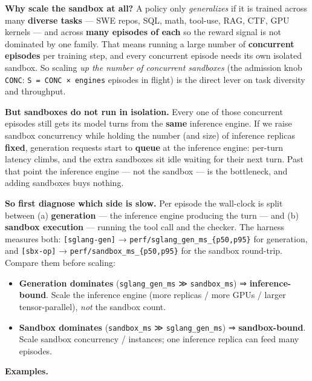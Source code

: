 \documentclass[
  paper=a4,
  ,captions=tableheading
]{scrartcl}
\providecommand{\tightlist}{%
  \setlength{\itemsep}{0pt}\setlength{\parskip}{0pt}}
\begin{document}
\textbf{Why scale the sandbox at all?} A policy only \emph{generalizes}
if it is trained across many \textbf{diverse tasks} --- SWE repos, SQL,
math, tool-use, RAG, CTF, GPU kernels --- and across \textbf{many
episodes of each} so the reward signal is not dominated by one family.
That means running a large number of \textbf{concurrent episodes} per
training step, and every concurrent episode needs its own isolated
sandbox. So scaling \emph{up the number of concurrent sandboxes} (the
admission knob \texttt{CONC}: \texttt{S\ =\ CONC\ ×\ engines} episodes
in flight) is the direct lever on task diversity and throughput.

\textbf{But sandboxes do not run in isolation.} Every one of those
concurrent episodes still gets its model turns from the \textbf{same}
inference engine. If we raise sandbox concurrency while holding the
number (and size) of inference replicas \textbf{fixed}, generation
requests start to \textbf{queue} at the inference engine: per-turn
latency climbs, and the extra sandboxes sit idle waiting for their next
turn. Past that point the inference engine --- not the sandbox --- is
the bottleneck, and adding sandboxes buys nothing.

\textbf{So first diagnose which side is slow.} Per episode the
wall-clock is split between (a) \textbf{generation} --- the inference
engine producing the turn --- and (b) \textbf{sandbox execution} ---
running the tool call and the checker. The harness measures both:
\texttt{{[}sglang-gen{]}} → \texttt{perf/sglang\_gen\_ms\_\{p50,p95\}}
for generation, and \texttt{{[}sbx-op{]}} →
\texttt{perf/sandbox\_ms\_\{p50,p95\}} for the sandbox round-trip.
Compare them before scaling:

\begin{itemize}
\tightlist
\item
  \textbf{Generation dominates} (\texttt{sglang\_gen\_ms} ≫
  \texttt{sandbox\_ms}) ⇒ \textbf{inference-bound}. Scale the inference
  engine (more replicas / more GPUs / larger tensor-parallel),
  \emph{not} the sandbox count.
\item
  \textbf{Sandbox dominates} (\texttt{sandbox\_ms} ≫
  \texttt{sglang\_gen\_ms}) ⇒ \textbf{sandbox-bound}. Scale sandbox
  concurrency / instances; one inference replica can feed many episodes.
\end{itemize}

\textbf{Examples.}
\end{document}
